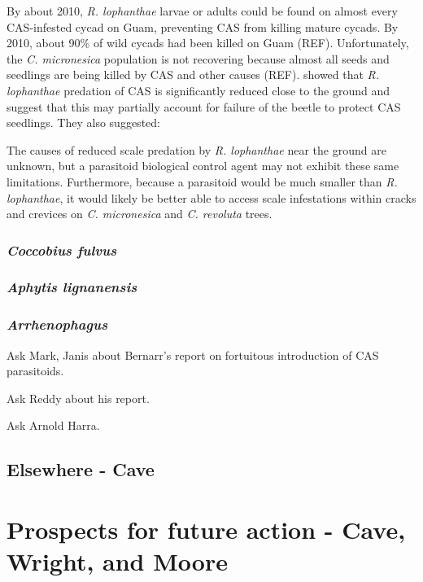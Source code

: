 \documentclass[12pt,letterpaper,english,bibliography=totocnumbered, abstract=on]{scrartcl}
\begin{document}
By about 2010, \textit{R. lophanthae} larvae or adults could be found on almost every CAS-infested cycad on Guam, preventing CAS from killing mature cycads. By 2010, about 90\% of wild cycads had been killed on Guam (REF). Unfortunately, the \textit{C. micronesica} population is not recovering because almost all seeds and seedlings are being killed by CAS and other causes (REF). \cite{marlerVerticalStratificationPredation2013} showed that \textit{R. lophanthae} predation of CAS is significantly reduced close to the ground and suggest that this may partially account for failure of the beetle to protect CAS seedlings. They also suggested:
\begin{displayquote}
The causes of reduced scale predation by
\textit{R. lophanthae} near the ground are unknown,
but a parasitoid biological control agent may
not exhibit these same limitations. Furthermore, because a parasitoid would be much
smaller than \textit{R. lophanthae}, it would likely be
better able to access scale infestations within
cracks and crevices on \textit{C. micronesica} and
\textit{C. revoluta} trees.
\end{displayquote}

\subsubsection{\textit{Coccobius fulvus}}  

\subsubsection{\textit{Aphytis lignanensis}}

\subsubsection{\textit{Arrhenophagus}}  

Ask Mark, Janis about Bernarr's report on fortuitous introduction of CAS parasitoids.

Ask Reddy about his report.

Ask Arnold Harra.


\subsection{Elsewhere - Cave}

\section{Prospects for future action - Cave, Wright, and Moore}
\end{document}
